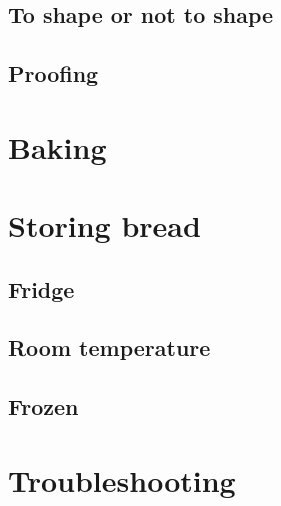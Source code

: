 \documentclass[a4paper, 12pt]{book}
\begin{document}
\section{To shape or not to shape}
\section{Proofing}

\chapter{Baking}


\chapter{Storing bread}
\section{Fridge}
\section{Room temperature}
\section{Frozen}

\chapter{Troubleshooting}




\printbibliography
\end{document}

